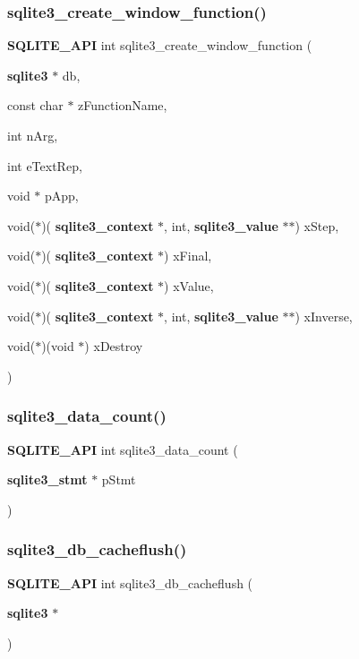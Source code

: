 \subsubsection{sqlite3\_create\_window\_function()}
{\footnotesize\ttfamily \textbf{ S\+Q\+L\+I\+T\+E\+\_\+\+A\+PI} int sqlite3\+\_\+create\+\_\+window\+\_\+function (\begin{DoxyParamCaption}\item[{\textbf{ sqlite3} $\ast$}]{db,  }\item[{const char $\ast$}]{z\+Function\+Name,  }\item[{int}]{n\+Arg,  }\item[{int}]{e\+Text\+Rep,  }\item[{void $\ast$}]{p\+App,  }\item[{void($\ast$)(\textbf{ sqlite3\+\_\+context} $\ast$, int, \textbf{ sqlite3\+\_\+value} $\ast$$\ast$)}]{x\+Step,  }\item[{void($\ast$)(\textbf{ sqlite3\+\_\+context} $\ast$)}]{x\+Final,  }\item[{void($\ast$)(\textbf{ sqlite3\+\_\+context} $\ast$)}]{x\+Value,  }\item[{void($\ast$)(\textbf{ sqlite3\+\_\+context} $\ast$, int, \textbf{ sqlite3\+\_\+value} $\ast$$\ast$)}]{x\+Inverse,  }\item[{void($\ast$)(void $\ast$)}]{x\+Destroy }\end{DoxyParamCaption})}

\mbox{\label{sqlite3_8h_ad2cbdf60a70c41d7aba2e7bf7e862da5}} 
\subsubsection{sqlite3\_data\_count()}
{\footnotesize\ttfamily \textbf{ S\+Q\+L\+I\+T\+E\+\_\+\+A\+PI} int sqlite3\+\_\+data\+\_\+count (\begin{DoxyParamCaption}\item[{\textbf{ sqlite3\+\_\+stmt} $\ast$}]{p\+Stmt }\end{DoxyParamCaption})}

\mbox{\label{sqlite3_8h_a3c80cae8031190fe9edb8e0db1a69bd0}} 
\subsubsection{sqlite3\_db\_cacheflush()}
{\footnotesize\ttfamily \textbf{ S\+Q\+L\+I\+T\+E\+\_\+\+A\+PI} int sqlite3\+\_\+db\+\_\+cacheflush (\begin{DoxyParamCaption}\item[{\textbf{ sqlite3} $\ast$}]{ }\end{DoxyParamCaption})}

